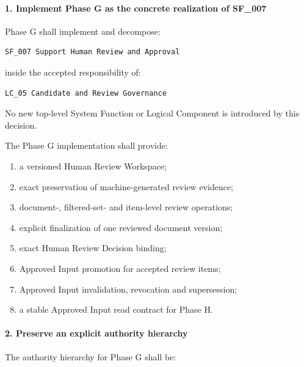 \hypertarget{1-implement-phase-g-as-the-concrete-realization-of-sf_007}{%
\paragraph{1. Implement Phase G as the concrete realization of SF\_007}\label{1-implement-phase-g-as-the-concrete-realization-of-sf_007}}

Phase G shall implement and decompose:

\begin{verbatim}
SF_007 Support Human Review and Approval
\end{verbatim}

inside the accepted responsibility of:

\begin{verbatim}
LC_05 Candidate and Review Governance
\end{verbatim}

No new top-level System Function or Logical Component is introduced by this decision.

The Phase G implementation shall provide:

\begin{enumerate}
\def\labelenumi{\arabic{enumi}.}
\tightlist
\item
  a versioned Human Review Workspace;
\item
  exact preservation of machine-generated review evidence;
\item
  document-, filtered-set- and item-level review operations;
\item
  explicit finalization of one reviewed document version;
\item
  exact Human Review Decision binding;
\item
  Approved Input promotion for accepted review items;
\item
  Approved Input invalidation, revocation and supersession;
\item
  a stable Approved Input read contract for Phase H.
\end{enumerate}

\hypertarget{2-preserve-an-explicit-authority-hierarchy}{%
\paragraph{2. Preserve an explicit authority hierarchy}\label{2-preserve-an-explicit-authority-hierarchy}}

The authority hierarchy for Phase G shall be:

